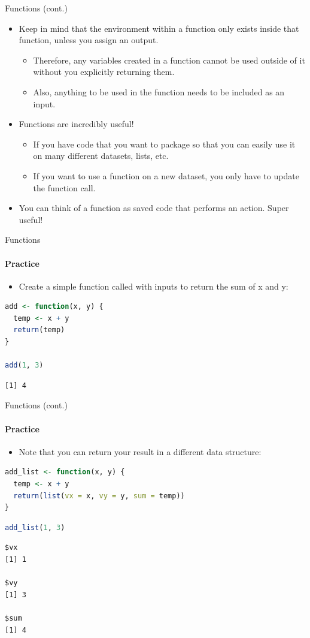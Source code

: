 \begin{frame}{Functions (cont.)}
\begin{itemize}
  \item Keep in mind that the environment within a function only exists inside that function, unless you assign an output.
  \begin{itemize}
    \item Therefore, any variables created in a function cannot be used outside of it without you explicitly returning them.
    \item Also, anything to be used in the function needs to be included as an input.
  \end{itemize}
  \item Functions are incredibly useful!
  \begin{itemize}
    \item If you have code that you want to package so that you can easily use it on many different datasets, lists, etc.
    \item If you want to use a function on a new dataset, you only have to update the function call.
  \end{itemize}
  \item You can think of a function as saved code that performs an action. Super useful!
\end{itemize}
\end{frame}

\begin{frame}[fragile]{Functions}
\framesubtitle{Practice}
\begin{itemize}
  \item Create a simple function called  with inputs  to return the sum of x and y:
\end{itemize}
\begin{lstlisting}[language=R]
add <- function(x, y) {
  temp <- x + y
  return(temp)
}

add(1, 3)
\end{lstlisting}
\begin{lstlisting}[style=output]
[1] 4
\end{lstlisting}
\end{frame}

\begin{frame}[fragile]{Functions (cont.)}
\framesubtitle{Practice}
\begin{itemize}
  \item Note that you can return your result in a different data structure:
\end{itemize}
\begin{lstlisting}[language=R]
add_list <- function(x, y) {
  temp <- x + y
  return(list(vx = x, vy = y, sum = temp))
}
\end{lstlisting}
\begin{lstlisting}[language=R]
add_list(1, 3)
\end{lstlisting}
\begin{lstlisting}[style=output]
$vx
[1] 1

$vy
[1] 3

$sum
[1] 4
\end{lstlisting}
\end{frame}


